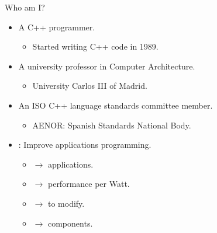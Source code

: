 \begin{frame}[t]{Who am I?}
\begin{itemize}
  \item A C++ programmer.
    \begin{itemize}
      \item Started writing C++ code in 1989.
    \end{itemize}
  \vfill\pause
  \item A university professor in Computer Architecture.
    \begin{itemize}
      \item University Carlos III of Madrid.
    \end{itemize}
  \vfill\pause
  \item An ISO C++ language standards committee member.
    \begin{itemize}
      \item AENOR: Spanish Standards National Body.
    \end{itemize}
  \vfill\pause
  \item {}: Improve applications programming.
    \begin{itemize}
      \item {} $\rightarrow$  applications.
      \item {} $\rightarrow$  performance per Watt.
      \item {} $\rightarrow$  to modify.
      \item {} $\rightarrow$  components.
    \end{itemize}
\end{itemize}
\end{frame}
